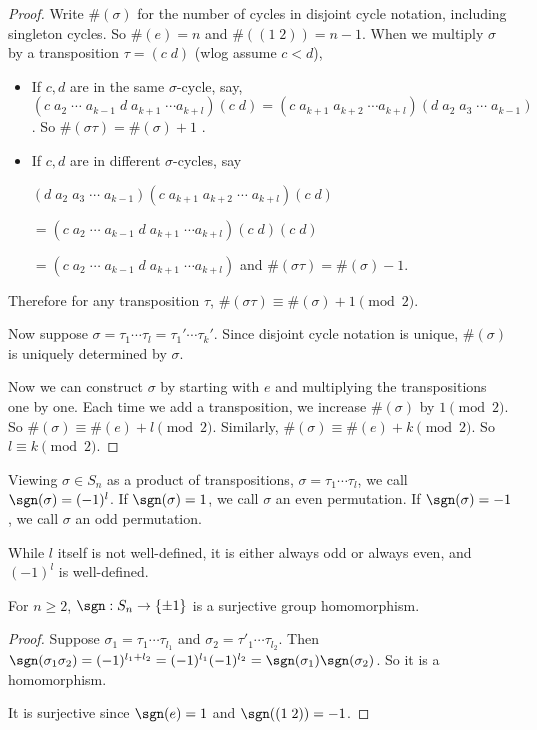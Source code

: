 \documentclass[a4paper]{article}
\begin{document}
\begin{proof}
  Write $\#(\sigma)$ for the number of cycles in disjoint cycle notation, including singleton cycles. So $\#(e) = n$ and $\#((1\; 2)) = n - 1$. When we multiply $\sigma$ by a transposition $\tau = (c\; d)$ (wlog assume $c < d$),
  \begin{itemize}
    \item If $c, d$ are in the same $\sigma$-cycle, say, $(c\; a_2\; \cdots \; a_{k - 1}\; d\; a_{k + 1}\; \cdots a_{k + l})(c\; d) = (c\; a_{k+1}\; a_{k+2}\;\cdots a_{k + l})(d\; a_2\; a_3\;\cdots\; a_{k - 1})$. So $\#(\sigma\tau) = \#(\sigma) + 1$ .
    \item If $c, d$ are in different $\sigma$-cycles, say

      $(d\; a_2\; a_3\;\cdots\;a_{k - 1})(c\; a_{k + 1}\; a_{k + 2}\;\cdots\; a_{k + l})(c\; d) $

      $=(c\; a_2\; \cdots \; a_{k - 1}\; d\; a_{k + 1}\; \cdots a_{k + l})(c\; d)(c\; d)$

      $= (c\; a_2\; \cdots \; a_{k - 1}\; d\; a_{k + 1}\; \cdots a_{k + l})$ and $\#(\sigma\tau) = \#(\sigma) - 1$.

  \end{itemize}
  Therefore for any transposition $\tau$, $\#(\sigma\tau) \equiv \#(\sigma) + 1 \pmod 2$.

  Now suppose $\sigma = \tau_1\cdots\tau_l = \tau_1'\cdots\tau_{k}'$. Since disjoint cycle notation is unique, $\#(\sigma)$ is uniquely determined by $\sigma$.

  Now we can construct $\sigma$ by starting with $e$ and multiplying the transpositions one by one. Each time we add a transposition, we increase $\#(\sigma)$ by $1 \pmod 2$. So $\#(\sigma) \equiv \#(e) + l\pmod 2$. Similarly, $\#(\sigma) \equiv \#(e) + k \pmod 2$. So $l \equiv k \pmod 2$.
\end{proof}

\begin{defi}
  Viewing $\sigma\in S_n$ as a product of transpositions, $\sigma = \tau_1\cdots \tau_l$, we call $\sgn(\sigma) = (-1)^l$. If $\sgn(\sigma) = 1$, we call $\sigma$ an even permutation. If $\sgn(\sigma) = -1$, we call $\sigma$ an odd permutation.
\end{defi}
While $l$ itself is not well-defined, it is either always odd or always even, and $(-1)^l$ is well-defined.

\begin{thm}
  For $n\geq 2$, $\sgn : S_n \rightarrow \{\pm 1\}$ is a surjective group homomorphism.
\end{thm}
\begin{proof}
  Suppose $\sigma_1 = \tau_1\cdots \tau_{l_1}$ and $\sigma_2 = \tau'_1\cdots \tau_{l_2}$. Then $\sgn(\sigma_1\sigma_2) = (-1)^{l_1 + l_2} = (-1)^{l_1}(-1)^{l_2} = \sgn(\sigma_1)\sgn(\sigma_2)$. So it is a homomorphism.

  It is surjective since $\sgn(e) = 1$ and $\sgn((1\; 2)) = -1$.
\end{proof}
\end{document}
